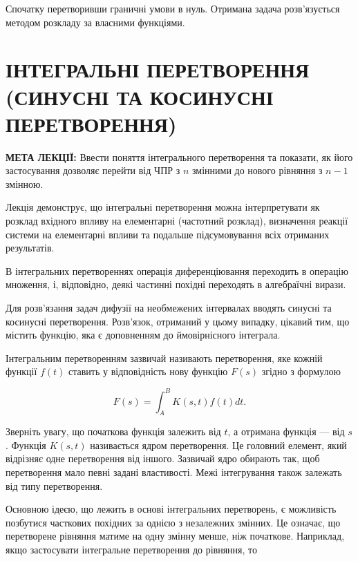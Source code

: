 \documentclass[
  ukrainian,
]{article}
\begin{document}
Спочатку перетворивши граничні умови в нуль. Отримана задача
розв'язується методом розкладу за власними функціями.

\section{ІНТЕГРАЛЬНІ ПЕРЕТВОРЕННЯ (СИНУСНІ ТА КОСИНУСНІ
ПЕРЕТВОРЕННЯ)}\label{ux456ux43dux442ux435ux433ux440ux430ux43bux44cux43dux456-ux43fux435ux440ux435ux442ux432ux43eux440ux435ux43dux43dux44f-ux441ux438ux43dux443ux441ux43dux456-ux442ux430-ux43aux43eux441ux438ux43dux443ux441ux43dux456-ux43fux435ux440ux435ux442ux432ux43eux440ux435ux43dux43dux44f}

\textbf{МЕТА ЛЕКЦІЇ:} Ввести поняття інтегрального перетворення та
показати, як його застосування дозволяє перейти від ЧПР з \(n\) змінними
до нового рівняння з \(n - 1\) змінною.

Лекція демонструє, що інтегральні перетворення можна інтерпретувати як
розклад вхідного впливу на елементарні (частотний розклад), визначення
реакції системи на елементарні впливи та подальше підсумовування всіх
отриманих результатів.

В інтегральних перетвореннях операція диференціювання переходить в
операцію множення, і, відповідно, деякі частинні похідні переходять в
алгебраїчні вирази.

Для розв'язання задач дифузії на необмежених інтервалах вводять синусні
та косинусні перетворення. Розв'язок, отриманий у цьому випадку, цікавий
тим, що містить функцію, яка є доповненням до ймовірнісного інтеграла.

Інтегральним перетворенням зазвичай називають перетворення, яке кожній
функції \(f(t)\) ставить у відповідність нову функцію \(F(s)\) згідно з
формулою

\[
F(s) = \int_{A}^{B} K(s, t) f(t) dt.
\]

Зверніть увагу, що початкова функція залежить від \(t\), а отримана
функція --- від \(s\). Функція \(K(s,t)\) називається ядром
перетворення. Це головний елемент, який відрізняє одне перетворення від
іншого. Зазвичай ядро обирають так, щоб перетворення мало певні задані
властивості. Межі інтегрування також залежать від типу перетворення.

Основною ідеєю, що лежить в основі інтегральних перетворень, є
можливість позбутися часткових похідних за однією з незалежних змінних.
Це означає, що перетворене рівняння матиме на одну змінну менше, ніж
початкове. Наприклад, якщо застосувати інтегральне перетворення до
рівняння, то
\end{document}
